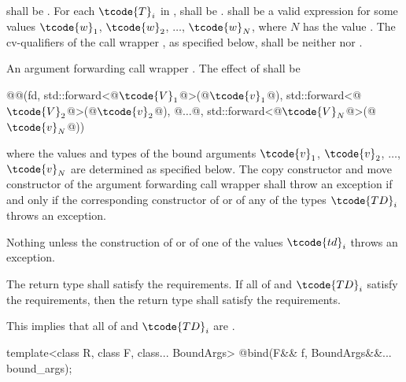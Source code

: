 \begin{itemdescr}
\pnum
\requires
{} shall be . For each $\tcode{T}_i$
in ,  shall be .
 shall be a valid expression for some
values $\tcode{w}_1$, $\tcode{w}_2$, $\dotsc{}$, $\tcode{w}_N$, where
$N$ has the value .
The cv-qualifiers \cv{} of the call wrapper ,
as specified below, shall be neither  nor .

\pnum\returns
An argument forwarding call wrapper .
The effect of  shall
be
\begin{codeblock}
@@(fd, std::forward<@$\tcode{V}_1$@>(@$\tcode{v}_1$@), std::forward<@$\tcode{V}_2$@>(@$\tcode{v}_2$@), @$\dotsc$@, std::forward<@$\tcode{V}_N$@>(@$\tcode{v}_N$@))
\end{codeblock}
where the values and types of the bound
arguments $\tcode{v}_1$, $\tcode{v}_2$, $\dotsc$, $\tcode{v}_N$ are determined as specified below.
The copy constructor and move constructor of the argument forwarding call wrapper shall throw an
exception if and only if the corresponding constructor of  or of any of the types
$\tcode{TD}_i$ throws an exception.

\pnum
\throws Nothing unless the construction of
 or of one of the values $\tcode{td}_i$ throws an exception.

\pnum
\remarks The return type shall satisfy the  requirements. If all
of  and $\tcode{TD}_i$ satisfy the  requirements, then the
return type shall satisfy the  requirements. \begin{note} This implies
that all of  and $\tcode{TD}_i$ are . \end{note}
\end{itemdescr}

%
\begin{itemdecl}
template<class R, class F, class... BoundArgs>
  @\unspec@ bind(F&& f, BoundArgs&&... bound_args);
\end{itemdecl}

